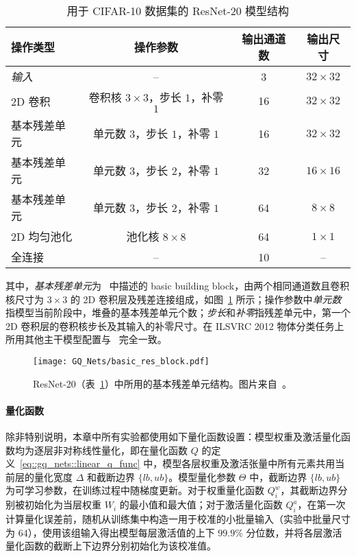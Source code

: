 \begin{table}[htb]
  \centering
  \caption{用于 CIFAR-10 数据集的 ResNet-20 模型结构}
  \label{tab::gq_nets::res20}
  \begin{tabular}{l*{3}{c}}
    \toprule
    操作类型 & 操作参数 & 输出通道数 & 输出尺寸 \\
    \midrule
    \emph{输入} & -- & 3 & $32\times32$ \\
    2D 卷积 & 卷积核 $3\times 3$，步长 $1$，补零 $1$ & 16 & $32\times 32$ \\
    基本残差单元 & 单元数 $3$，步长 $1$，补零 $1$ & 16 & $32\times 32$ \\
    基本残差单元 & 单元数 $3$，步长 $2$，补零 $1$ & 32 & $16\times 16$ \\
    基本残差单元 & 单元数 $3$，步长 $2$，补零 $1$ & 64 & $8\times 8$ \\
    2D 均匀池化 & 池化核 $8\times 8$ & 64 & $1\times 1$ \\
    全连接 & -- & 10 & -- \\
    \bottomrule
  \end{tabular}
\end{table}

其中，\emph{基本残差单元}为~\citet{He_2016} 中描述的 basic building block，由两个相同通道数且卷积核尺寸为 $3\times 3$ 的 2D 卷积层及残差连接组成，如图~\ref{img::gq_nets::basic_res_block} 所示；操作参数中\emph{单元数}指模型当前阶段中，堆叠的基本残差单元个数；\emph{步长}和\emph{补零}指残差单元中，第一个 2D 卷积层的卷积核步长及其输入的补零尺寸。在 ILSVRC 2012 物体分类任务上所用其他主干模型配置与~\citet{He_2016,howard2017mobilenets,Sandler_2018} 完全一致。

\begin{figure}[htb]
  \centering
  \texttt{[image: GQ\_Nets/basic\_res\_block.pdf]}
  \caption{ResNet-20（表~\ref{tab::gq_nets::res20}）中所用的基本残差单元结构。图片来自~\citet{He_2016}。}
  \label{img::gq_nets::basic_res_block}
\end{figure}

\paragraph{量化函数}
除非特别说明，本章中所有实验都使用如下量化函数设置：模型权重及激活量化函数均为逐层非对称线性量化，即在量化函数 $Q$ 的定义~\eqref{eq::gq_nets::linear_q_func} 中，模型各层权重及激活张量中所有元素共用当前层的量化宽度 $\Delta$ 和截断边界 $\{lb, ub\}$。模型量化参数 $\Theta$ 中，截断边界 $\{lb, ub\}$ 为可学习参数，在训练过程中随梯度更新。对于权重量化函数 $Q^w_i$，其截断边界分别被初始化为当层权重 $W_i$ 的最小值和最大值；对于激活量化函数 $Q^a_i$，在第一次计算量化误差前，随机从训练集中构造一用于校准的小批量输入（实验中批量尺寸为 $64$），使用该组输入得出模型每层激活值的上下 $99.9\%$ 分位数，并将各层激活量化函数的截断上下边界分别初始化为该校准值。
